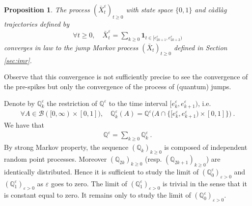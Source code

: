 \documentclass[reqno, 12pt, a4paper]{amsart}
\theoremstyle{plain}
\newtheorem{proposition}[theorem]{Proposition}
\theoremstyle{definition}
\begin{document}
\begin{proposition}
The process $({\bar X}^\varepsilon_t)_{t \ge 0}$ with state space $\{0,1\}$ and c\`adl\`ag  trajectories defined by 
\begin{equation}
\begin{split}
\forall t \ge 0, \quad {\bar X}^\varepsilon_t = \sum_{k\ge 0} {\mathbf 1}_{ t \in [e_{2k+1}^{\varepsilon}, e_{2k+2}^\varepsilon )} 
\end{split}
\end{equation}
converges in law to the jump Markov process $({\bar X}_t)_{t \ge 0}$ defined in Section \ref{sec:imr}.
\end{proposition}

Observe that this convergence is not sufficiently precise to see the convergence of the pre-spikes but only the convergence of the process of (quantum) jumps.


\bigskip


Denote by $\mathbb Q_k^{\varepsilon}$ the restriction of $\mathbb Q^\varepsilon$ to the time interval $[e_k^\varepsilon, e_{k+1}^\varepsilon)$, i.e. 
\begin{equation}
\begin{split}
\forall A \in \mathcal B ([0, \infty) \times [0,1]), \quad \mathbb Q^\varepsilon_k (A)= \mathbb Q^\varepsilon \Big(A\cap \{ [e_k^\varepsilon, e_{k+1}^\varepsilon)\times [0,1]\} \Big) \ .
\end{split}
\end{equation}
We have that 
\begin{equation}
\begin{split}
\mathbb Q^\varepsilon = \sum_{k \ge 0} \mathbb Q_k^\varepsilon \ .
\end{split}
\end{equation}
By strong Markov property, the sequence $(\mathbb Q_k)_{k \ge 0}$ is composed of independent random point processes. Moreover $(\mathbb Q_{2k})_{k\ge 0}$ (resp. $(\mathbb Q_{2k+1})_{k \ge 0}$) are identically distributed. Hence it is sufficient to study the limit of $(\mathbb Q_0^\varepsilon)_{\varepsilon >0}$ and $(\mathbb Q_1^\varepsilon)_{\varepsilon>0}$ as $\varepsilon$ goes to zero. The limit of $(\mathbb Q_1^\varepsilon)_{\varepsilon>0}$ is trivial in the sense that it is constant equal to zero. It remains only to study the limit of $(\mathbb Q_0^\varepsilon)_{\varepsilon >0}$. 
\end{document}
